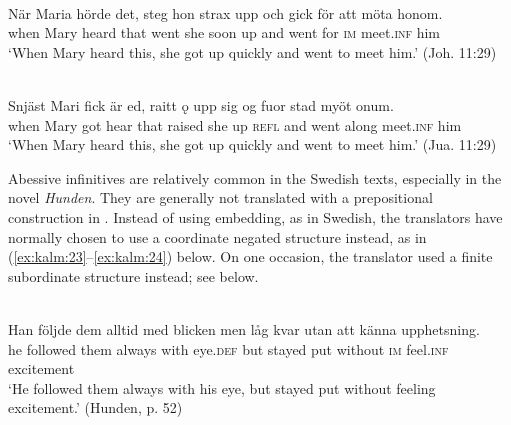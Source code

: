 \documentclass[output=paper]{langscibook}
\begin{document}
\ea
\label{ex:kalm:22}
\ea {}\label{ex:kalm:22a}\\
\gll När Maria hörde det, steg hon strax upp och gick för att möta honom.\\
when Mary heard that went she soon up and went for \textsc{im} meet.\textsc{inf} him\\
\glt ‘When Mary heard this, she got up quickly and went to meet him.’ (Joh. 11:29)

\ex {}\label{ex:kalm:22b}\\ 
\gll Snjäst Mari fick är ed, raitt ǫ upp sig og fuor stad myöt onum.\\
when Mary got hear that raised she up \textsc{refl} and went along meet.\textsc{inf} him\\
\glt ‘When Mary heard this, she got up quickly and went to meet him.’ (Jua. 11:29)
\z 
\z 


Abessive infinitives are relatively common in the Swedish texts, especially in the novel \textit{Hunden}. They are generally not translated with a prepositional construction in . Instead of using embedding, as in Swedish, the  translators have normally chosen to use a coordinate negated structure instead, as in (\ref{ex:kalm:23}--\ref{ex:kalm:24}) below. On one occasion, the translator used a finite subordinate structure instead; see  below.\largerpage[-1]


\ea
\label{ex:kalm:23}
\ea {}\label{ex:kalm:23a}\\
\gll Han följde dem alltid med blicken men låg kvar utan att känna upphetsning.\\
he followed them always with eye.\textsc{def} but stayed put without \textsc{im} feel.\textsc{inf} excitement\\
\glt ‘He followed them always with his eye, but stayed put without feeling excitement.’ (Hunden, p. 52)\\
\end{document}
